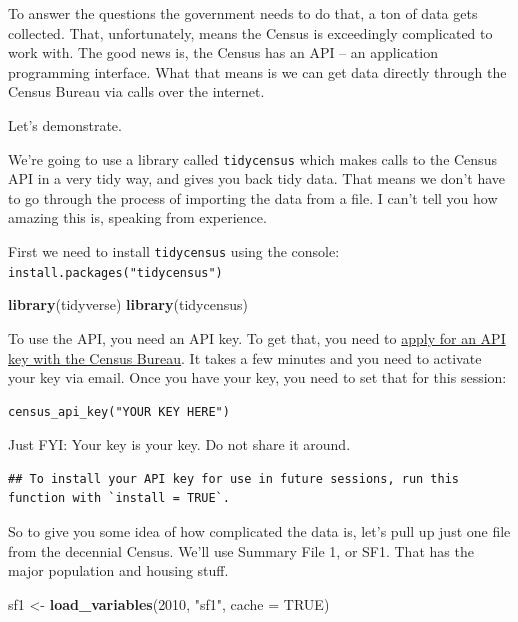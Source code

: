 \documentclass[]{book}
\newenvironment{Shaded}{\begin{snugshade}}{\end{snugshade}}
\newcommand{\DataTypeTok}[1]{\textcolor[rgb]{0.13,0.29,0.53}{#1}}
\newcommand{\DecValTok}[1]{\textcolor[rgb]{0.00,0.00,0.81}{#1}}
\newcommand{\KeywordTok}[1]{\textcolor[rgb]{0.13,0.29,0.53}{\textbf{#1}}}
\newcommand{\NormalTok}[1]{#1}
\newcommand{\OtherTok}[1]{\textcolor[rgb]{0.56,0.35,0.01}{#1}}
\newcommand{\StringTok}[1]{\textcolor[rgb]{0.31,0.60,0.02}{#1}}
\begin{document}
To answer the questions the government needs to do that, a ton of data gets collected. That, unfortunately, means the Census is exceedingly complicated to work with. The good news is, the Census has an API -- an application programming interface. What that means is we can get data directly through the Census Bureau via calls over the internet.

Let's demonstrate.

We're going to use a library called \texttt{tidycensus} which makes calls to the Census API in a very tidy way, and gives you back tidy data. That means we don't have to go through the process of importing the data from a file. I can't tell you how amazing this is, speaking from experience.

First we need to install \texttt{tidycensus} using the console: \texttt{install.packages("tidycensus")}

\begin{Shaded}
\begin{Highlighting}[]
\KeywordTok{library}\NormalTok{(tidyverse)}
\KeywordTok{library}\NormalTok{(tidycensus)}
\end{Highlighting}
\end{Shaded}

To use the API, you need an API key. To get that, you need to \href{https://api.census.gov/data/key_signup.html}{apply for an API key with the Census Bureau}. It takes a few minutes and you need to activate your key via email. Once you have your key, you need to set that for this session:

\begin{verbatim}
census_api_key("YOUR KEY HERE")
\end{verbatim}

Just FYI: Your key is your key. Do not share it around.

\begin{verbatim}
## To install your API key for use in future sessions, run this function with `install = TRUE`.
\end{verbatim}

So to give you some idea of how complicated the data is, let's pull up just one file from the decennial Census. We'll use Summary File 1, or SF1. That has the major population and housing stuff.

\begin{Shaded}
\begin{Highlighting}[]
\NormalTok{sf1 <-}\StringTok{ }\KeywordTok{load_variables}\NormalTok{(}\DecValTok{2010}\NormalTok{, }\StringTok{"sf1"}\NormalTok{, }\DataTypeTok{cache =} \OtherTok{TRUE}\NormalTok{)}
\end{Highlighting}
\end{Shaded}
\end{document}
